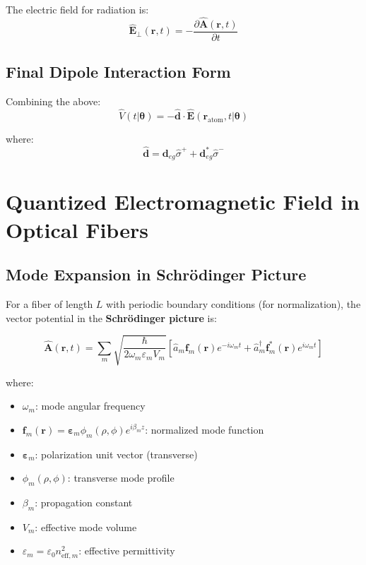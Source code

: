 \documentclass[12pt,a4paper]{article}
\begin{document}
The electric field for radiation is:
\begin{equation}
\hat{\mathbf{E}}_{\perp}(\mathbf{r}, t) = -\frac{\partial \hat{\mathbf{A}}(\mathbf{r}, t)}{\partial t} \label{eq:E_from_A}
\end{equation}

\subsection{Final Dipole Interaction Form}

Combining the above:
\begin{equation}
\hat{V}(t|\boldsymbol{\theta}) = -\hat{\mathbf{d}} \cdot \hat{\mathbf{E}}(\mathbf{r}_{\text{atom}}, t|\boldsymbol{\theta}) \label{eq:dipole_interaction}
\end{equation}

where:
\begin{equation}
\hat{\mathbf{d}} = \mathbf{d}_{eg} \hat{\sigma}^+ + \mathbf{d}_{eg}^* \hat{\sigma}^- \label{eq:dipole_operator}
\end{equation}

\section{Quantized Electromagnetic Field in Optical Fibers}

\subsection{Mode Expansion in Schrödinger Picture}

For a fiber of length $L$ with periodic boundary conditions (for normalization), the vector potential in the \textbf{Schrödinger picture} is:

\begin{equation}
\hat{\mathbf{A}}(\mathbf{r}, t) = \sum_m \sqrt{\frac{\hbar}{2\omega_m \varepsilon_m V_m}} \left[\hat{a}_m \mathbf{f}_m(\mathbf{r})e^{-i\omega_m t} + \hat{a}_m^\dagger \mathbf{f}_m^*(\mathbf{r})e^{i\omega_m t}\right] \label{eq:A_schrodinger}
\end{equation}

where:
\begin{itemize}[leftmargin=*]
\item $\omega_m$: mode angular frequency
\item $\mathbf{f}_m(\mathbf{r}) = \boldsymbol{\varepsilon}_m \phi_m(\rho, \phi) e^{i\beta_m z}$: normalized mode function
\item $\boldsymbol{\varepsilon}_m$: polarization unit vector (transverse)
\item $\phi_m(\rho, \phi)$: transverse mode profile
\item $\beta_m$: propagation constant
\item $V_m$: effective mode volume
\item $\varepsilon_m = \varepsilon_0 n_{\text{eff},m}^2$: effective permittivity
\end{itemize}
\end{document}
